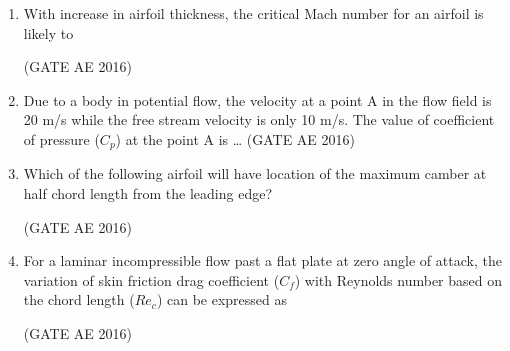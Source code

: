 \documentclass[journal,12pt,onecolumn]{IEEEtran}
\theoremstyle{remark}
\begin{document}
\begin{enumerate}
\item  With increase in airfoil thickness, the critical Mach number for an airfoil is likely to  
\begin{enumerate}
\end{enumerate}
\hfill(GATE AE 2016)



\item Due to a body in potential flow, the velocity at a point A in the flow field is 20 m/s while the free stream velocity is only 10 m/s. The value of coefficient of pressure ($C_p$) at the point A is \dots
\hfill(GATE AE 2016)



\item Which of the following airfoil will have location of the maximum camber at half chord length from the leading edge?  
\begin{enumerate}
\end{enumerate}
\hfill(GATE AE 2016)



\item For a laminar incompressible flow past a flat plate at zero angle of attack, the variation of skin friction drag coefficient ($C_f$) with Reynolds number based on the chord length ($Re_c$) can be expressed as  
\begin{enumerate}
\end{enumerate}
\hfill(GATE AE 2016)




\end{enumerate}
\end{document}
